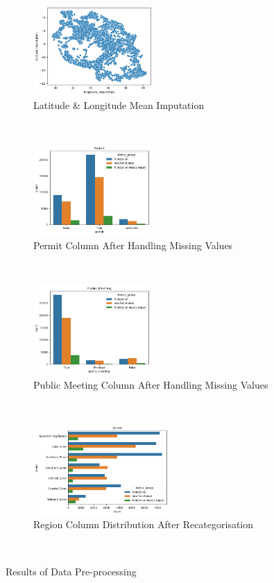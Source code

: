 \documentclass[conference]{IEEEtran}
\begin{document}
\begin{figure}[t!]
  \centering
  \begin{subfigure}[t]{0.225\textwidth}
      \centering
      \includegraphics[height=1.35in]{figures/jason_imputation.png}
      \caption{Latitude \& Longitude Mean Imputation}
  \end{subfigure}%
  ~
  \begin{subfigure}[t]{0.225\textwidth}
      \centering
      \includegraphics[height=1.35in]{figures/jason_permit.png}
      \caption{Permit Column After Handling Missing Values}
  \end{subfigure}
  ~
  \begin{subfigure}[t]{0.225\textwidth}
      \centering
      \includegraphics[height=1.35in]{figures/jason_public.png}
      \caption{Public Meeting Column After Handling Missing Values}
  \end{subfigure}
  ~
   \begin{subfigure}[t]{0.225\textwidth}
      \centering
      \includegraphics[height=1.35in]{figures/jason_zones.png}
      \caption{Region Column Distribution After Recategorisation}
  \end{subfigure}
  ~
  \caption{Results of Data Pre-processing}
  \label{fig:jason_preprocessing}
\end{figure}
\end{document}
